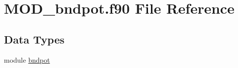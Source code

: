 \hypertarget{MOD__bndpot_8f90}{\section{M\-O\-D\-\_\-bndpot.\-f90 File Reference}
\label{MOD__bndpot_8f90}
}
\subsection*{Data Types}
\begin{DoxyCompactItemize}
\item 
module \hyperlink{classbndpot}{bndpot}
\end{DoxyCompactItemize}
